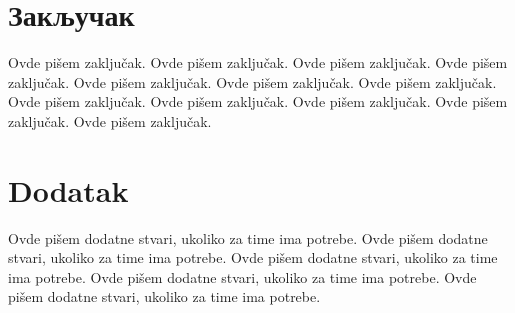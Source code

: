 \documentclass[a4paper]{article}
\begin{document}
\section{Закључак}
\label{sec:zakljucak}

Ovde pišem zaključak. 
Ovde pišem zaključak. 
Ovde pišem zaključak. 
Ovde pišem zaključak. 
Ovde pišem zaključak. 
Ovde pišem zaključak. 
Ovde pišem zaključak. 
Ovde pišem zaključak. 
Ovde pišem zaključak. 
Ovde pišem zaključak. 
Ovde pišem zaključak. 
Ovde pišem zaključak. 


\appendix
 


\appendix
\section{Dodatak}
Ovde pišem dodatne stvari, ukoliko za time ima potrebe.
Ovde pišem dodatne stvari, ukoliko za time ima potrebe.
Ovde pišem dodatne stvari, ukoliko za time ima potrebe.
Ovde pišem dodatne stvari, ukoliko za time ima potrebe.
Ovde pišem dodatne stvari, ukoliko za time ima potrebe.
\end{document}
